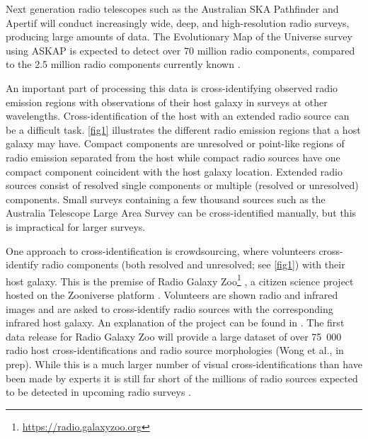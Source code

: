 \documentclass[fleqn,usenatbib,usedcolumn]{mnras}
\begin{document}
  Next generation radio telescopes such as the Australian SKA Pathfinder
  \citep[ASKAP;][]{johnston07} and Apertif \citep{verheijen08} will conduct
  increasingly wide, deep, and high-resolution radio surveys, producing large
  amounts of data. The Evolutionary Map of the Universe
  \citep[EMU;][]{norris11} survey using ASKAP is expected to detect over 70 million
  radio components, compared to the 2.5 million radio components currently
  known \citep{banfield15}.

  An important part of processing this data is cross-identifying observed
  radio emission regions with observations of their host galaxy in surveys at
  other wavelengths. Cross-identification of the host with an extended radio
  source can be a difficult task. \autoref{fig1} illustrates the different
  radio emission regions that a host galaxy may have. Compact components are
  unresolved or point-like regions of radio emission separated from the host
  while compact radio sources have one compact component coincident with the
  host galaxy location. Extended radio sources consist of resolved single
  components or multiple (resolved or unresolved) components. Small surveys
  containing a few thousand sources such as the Australia Telescope Large Area Survey
  \citep[ATLAS;][]{norris06,middelberg08} can be cross-identified manually,
  but this is impractical for larger surveys.

  One approach to cross-identification is crowdsourcing, where volunteers
  cross-identify radio components (both resolved and unresolved; see
  \autoref{fig1}) with their host galaxy. This is the premise of Radio Galaxy
  Zoo\footnote{\url{https://radio.galaxyzoo.org}} \citep{banfield15}, a
  citizen science project hosted on the Zooniverse platform \citep{lintott08}.
  Volunteers are shown radio and infrared images and are asked to
  cross-identify radio sources with the corresponding infrared host galaxy. An
  explanation of the project can be found in \citet{banfield15}. The first
  data release for Radio Galaxy Zoo will provide a large dataset of over
  75~000 radio host cross-identifications and radio source morphologies
  (Wong et al., in prep). While this is a much larger number of visual
  cross-identifications than have been made by experts \citep[e.g.,
  ][]{Taylor2007,Gendre2008,Grant2010,norris06,middelberg08} it is still far
  short of the millions of radio sources expected to be detected in upcoming
  radio surveys \citep{norris17surveys}.
\end{document}
